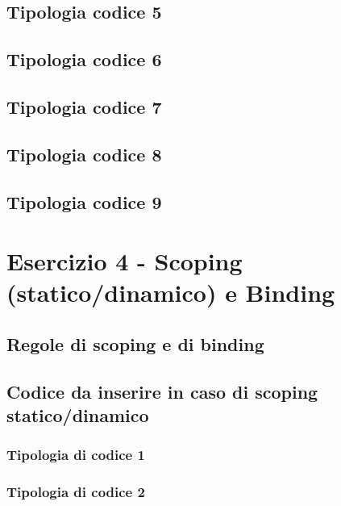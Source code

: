 \documentclass[a4paper]{article}
\begin{document}
	\subsection{Tipologia codice 5}
	
	
	\subsection{Tipologia codice 6}
	
	
	\subsection{Tipologia codice 7}
	
	
	\subsection{Tipologia codice 8}
	
	
	\subsection{Tipologia codice 9}
	
	
	\section{Esercizio 4 - Scoping (statico/dinamico) e Binding}
	
	\subsection{Regole di scoping e di binding}
	
	\subsection{Codice da inserire in caso di scoping statico/dinamico}
	
	\subsubsection{Tipologia di codice 1}
	
	\subsubsection{Tipologia di codice 2}
	
\end{document}
